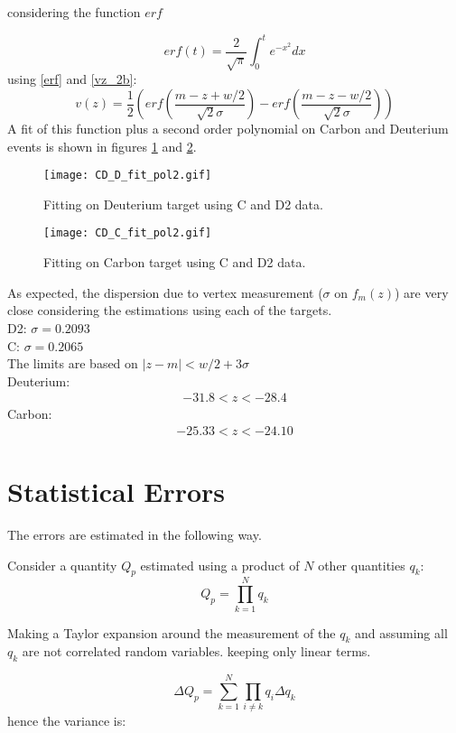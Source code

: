 considering the function $erf$

\begin{equation}
erf(t) = \frac{2}{\sqrt{\pi}}\int_0^t e^{-x^2}dx \label{erf}
\end{equation}
using \eqref{erf} and \eqref{vz_2b}:
%
\begin{equation}
v(z) = \frac{1}{2}\left(erf(\frac{m-z+w/2}{\sqrt{2}\sigma} ) - erf(\frac{m-z-w/2}{\sqrt{2}\sigma} )\right)
\end{equation}
A fit of this function plus a second order polynomial on Carbon and Deuterium events is shown in figures \ref{fig:D} and \ref{fig:C}.
%
\begin{figure}[!ht]
\texttt{[image: CD\_D\_fit\_pol2.gif]}
\caption{Fitting on Deuterium target using C and D2 data.}
\label{fig:D}
\end{figure}
%
\begin{figure}[!hb]
\texttt{[image: CD\_C\_fit\_pol2.gif]}
\caption{Fitting on Carbon target using C and D2 data.}
\label{fig:C}
\end{figure}
%
As expected, the dispersion due to vertex measurement ($\sigma$ on $f_m(z)$) are very close considering the estimations using each of the targets.\\
D2: $\sigma = 0.2093$\\
C: $\sigma= 0.2065$\\
%
The limits are based on $|z-m|<w/2 + 3\sigma$\\
Deuterium:
\begin{align}
-31.8<z<-28.4
\end{align}
Carbon:
\begin{align}
-25.33<z<-24.10
\end{align}
\section{Statistical Errors}
The errors are estimated in the following way.

Consider a quantity $Q_p$ estimated using a product of $N$ other quantities $q_k$:
\begin{equation}
Q_p = \prod_{k=1}^N q_k
\end{equation}

Making a Taylor expansion around the measurement of the $q_k$ and assuming all $q_k$ are not correlated random variables. keeping only linear terms.

\begin{equation}
\Delta Q_p = \sum_{k=1}^N \prod_{i\neq k}q_i \Delta q_k \label{eq:taylor_expansion}
\end{equation}
hence the variance is:

